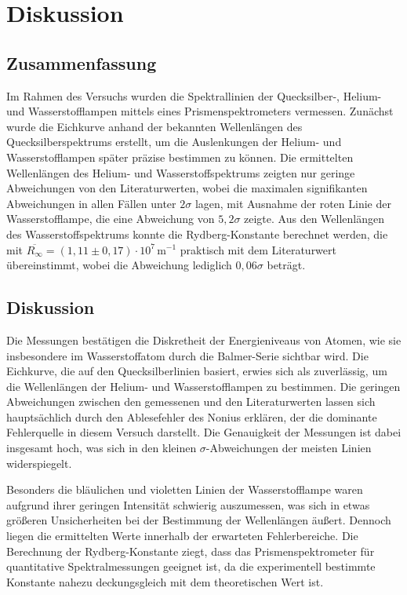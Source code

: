 \chapter{Diskussion}

\section{Zusammenfassung}

Im Rahmen des Versuchs wurden die Spektrallinien der Quecksilber-, Helium- und Wasserstofflampen mittels eines Prismenspektrometers vermessen. Zunächst wurde die Eichkurve anhand der bekannten Wellenlängen des Quecksilberspektrums erstellt, um die Auslenkungen der Helium- und Wasserstofflampen später präzise bestimmen zu können. Die ermittelten Wellenlängen des Helium- und Wasserstoffspektrums zeigten nur geringe Abweichungen von den Literaturwerten, wobei die maximalen signifikanten Abweichungen in allen Fällen unter $2\sigma$ lagen, mit Ausnahme der roten Linie der Wasserstofflampe, die eine Abweichung von $5,2\sigma$ zeigte. Aus den Wellenlängen des Wasserstoffspektrums konnte die Rydberg-Konstante berechnet werden, die mit $\overline{R_\infty} = (1,11 \pm 0,17)\cdot 10^7 \, \mathrm{m^{-1}}$ praktisch mit dem Literaturwert übereinstimmt, wobei die Abweichung lediglich $0,06\sigma$ beträgt.

\section{Diskussion}

Die Messungen bestätigen die Diskretheit der Energieniveaus von Atomen, wie sie insbesondere im Wasserstoffatom durch die Balmer-Serie sichtbar wird. Die Eichkurve, die auf den Quecksilberlinien basiert, erwies sich als zuverlässig, um die Wellenlängen der Helium- und Wasserstofflampen zu bestimmen. Die geringen Abweichungen zwischen den gemessenen und den Literaturwerten lassen sich hauptsächlich durch den Ablesefehler des Nonius erklären, der die dominante Fehlerquelle in diesem Versuch darstellt. Die Genauigkeit der Messungen ist dabei insgesamt hoch, was sich in den kleinen $\sigma$-Abweichungen der meisten Linien widerspiegelt.  

Besonders die bläulichen und violetten Linien der Wasserstofflampe waren aufgrund ihrer geringen Intensität schwierig auszumessen, was sich in etwas größeren Unsicherheiten bei der Bestimmung der Wellenlängen äußert. Dennoch liegen die ermittelten Werte innerhalb der erwarteten Fehlerbereiche. Die Berechnung der Rydberg-Konstante ziegt, dass das Prismenspektrometer für quantitative Spektralmessungen geeignet ist, da die experimentell bestimmte Konstante nahezu deckungsgleich mit dem theoretischen Wert ist.

